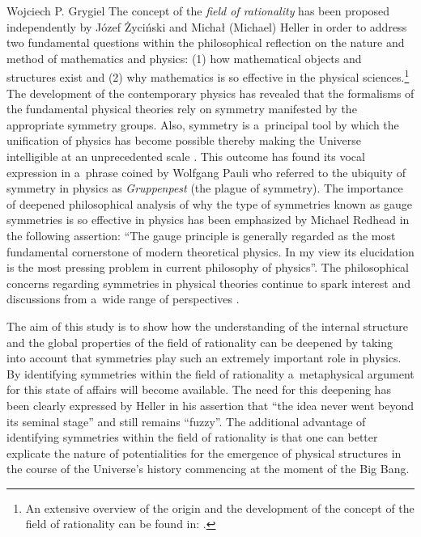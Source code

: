 \begin{artengenv}{Wojciech P. Grygiel}
\lettrine[loversize=0.13,lines=2,lraise=-0.03,nindent=0em,findent=0.2pt]%
{T}{}he concept of the \textit{field of rationality} has been proposed independently by Józef Życiński and Michał (Michael) Heller in order to address two fundamental questions within the philosophical reflection on the nature and method of mathematics and physics: (1) how mathematical objects and structures exist and (2) why mathematics is so effective in the physical sciences.\footnote{An extensive overview of the origin and the development of the concept of the field of rationality can be found in: 
\parencites[][]{pabjan_jozefa_2011}[][]{grygiel_critical_2022}. %
 } The development of the contemporary physics has revealed that the formalisms of the fundamental physical theories rely on symmetry manifested by the appropriate symmetry groups. Also, symmetry is a~principal tool by which the unification of physics has become possible thereby making the Universe intelligible at an unprecedented scale 
\parencite[e.g][]{gross_role_1996}. %
 This outcome has found its vocal expression in a~phrase coined by Wolfgang Pauli who referred to the ubiquity of symmetry in physics as \textit{Gruppenpest} (the plague of symmetry). The importance of deepened philosophical analysis of why the type of symmetries known as gauge symmetries is so effective in physics has been emphasized by Michael Redhead 
\parencite*[][p.138]{brading_interpretation_2003} %
 in the following assertion: ``The gauge principle is generally regarded as the most fundamental cornerstone of modern theoretical physics. In my view its elucidation is the most pressing problem in current philosophy of physics''. The philosophical concerns regarding symmetries in physical theories continue to spark interest and discussions from a~wide range of perspectives 
\parencite[e.g][]{dardashti_editorial_2021}.%




The aim of this study is to show how the understanding of the internal structure and the global properties of the field of rationality can be deepened by taking into account that symmetries play such an extremely important role in physics. By identifying symmetries within the field of rationality a~metaphysical argument for this state of affairs will become available. The need for this deepening has been clearly expressed by Heller 
\parencite*[][p.442]{heller_field_2014} %
 in his assertion that ``the idea never went beyond its seminal stage'' and still remains ``fuzzy''. The additional advantage of identifying symmetries within the field of rationality is that one can better explicate the nature of potentialities for the emergence of physical structures in the course of the Universe's history commencing at the moment of the Big Bang.




\end{artengenv}
